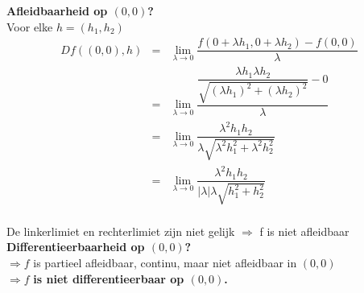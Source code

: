 \documentclass[a4paper]{article}
\newcommand{\llim}{\lim\limits}
\begin{document}
\newpage

\textbf{Afleidbaarheid op $(0,0)$?}\\

Voor elke $h = (h_1, h_2)$\\

\begin{eqnarray*}
	Df((0,0), h) &=& \llim_{\lambda \to 0} \dfrac{f(0+\lambda h_1, 0+ \lambda h_2)-f(0,0)}{\lambda}\\
	&=& \llim_{\lambda \to 0} \dfrac{\dfrac{\lambda h_1\lambda h_2}{\sqrt{(\lambda h_1)^2 + (\lambda h_2)^2}}-0}{\lambda}\\
	&=& \llim_{\lambda \to 0} \dfrac{\lambda^2 h_1 h_2}{\lambda \sqrt{\lambda^2 h_1^2 + \lambda^2 h_2^2}}\\
	&=& \llim_{\lambda \to 0} \dfrac{\lambda^2 h_1 h_2}{|\lambda|\lambda \sqrt{h_1^2 + h_2^2}}\\
\end{eqnarray*}

De linkerlimiet en rechterlimiet zijn niet gelijk $\Rightarrow$ f is niet afleidbaar\\

\textbf{Differentieerbaarheid op $(0,0)$?}\\

$\Rightarrow f$ is partieel afleidbaar, continu, maar niet afleidbaar in $(0,0)$\\

$ \Rightarrow f$ \textbf{is niet differentieerbaar op $(0,0)$.}

\begin{thebibliography}{999}
\end{thebibliography}
\end{document}
